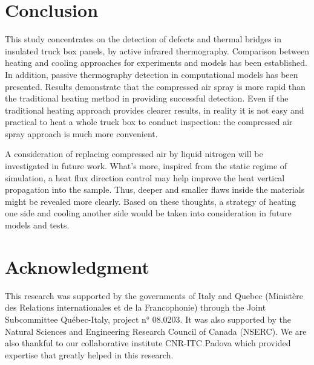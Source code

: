 \documentclass{tQRT2e}
\begin{document}
\section{Conclusion}
This study concentrates on the detection of defects and thermal bridges in insulated truck box panels, by active infrared thermography. Comparison between heating and cooling approaches for experiments and models has been established. In addition, passive thermography detection in computational models has been presented. Results demonstrate that the compressed air spray is more rapid than the traditional heating method in providing successful detection. Even if the traditional heating approach provides clearer results, in reality it is not easy and practical to heat a whole truck box to conduct inspection: the compressed air spray approach is much more convenient. 

A consideration of replacing compressed air by liquid nitrogen will be investigated in future work. What’s more, inspired from the static regime of simulation, a heat flux direction control may help improve the heat vertical propagation into the sample. Thus, deeper and smaller flaws inside the materials might be revealed more clearly. Based on these thoughts, a strategy of heating one side and cooling another side would be taken into consideration in future models and tests.

\section*{Acknowledgment}
This research was supported by the governments of Italy and Quebec (Ministère des Relations internationales et de la Francophonie) through the Joint Subcommittee Québec-Italy, project n° 08.0203. It was also supported by  the Natural Sciences and Engineering Research Council of Canada (NSERC). We are also thankful to our collaborative institute CNR-ITC Padova which provided expertise that greatly helped in this research. 



\end{document}
